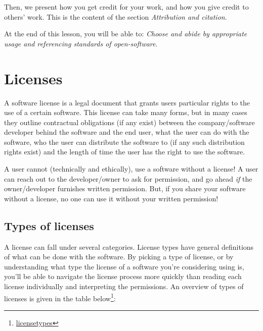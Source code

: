 \documentclass[
  letterpaper,
  DIV=11,
  numbers=noendperiod]{scrreport}
\begin{document}
Then, we present how you get credit for your work, and how you give
credit to others' work. This is the content of the section
\emph{Attribution and citation}.

At the end of this lesson, you will be able to: \emph{Choose and abide
by appropriate usage and referencing standards of open-software}.

\hypertarget{licenses}{%
\section{Licenses}\label{licenses}}

A software license is a legal document that grants users particular
rights to the use of a certain software. This license can take many
forms, but in many cases they outline contractual obligations (if any
exist) between the company/software developer behind the software and
the end user, what the user can do with the software, who the user can
distribute the software to (if any such distribution rights exist) and
the length of time the user has the right to use the software.

A user cannot (technically and ethically), use a software without a
license! A user can reach out to the developer/owner to ask for
permission, and go ahead \emph{if} the owner/developer furnishes written
permission. But, if you share your software without a license, no one
can use it without your written permission!

\hypertarget{types-of-licenses}{%
\subsection{Types of licenses}\label{types-of-licenses}}

A license can fall under several categories. License types have general
definitions of what can be done with the software. By picking a type of
license, or by understanding what type the license of a software you're
considering using is, you'll be able to navigate the license process
more quickly than reading each license individually and interpreting the
permissions. An overview of types of licenses is given in the table
below\footnote{\href{https://www.techtarget.com/searchcio/definition/software-license\#:~:text=A\%20software\%20license\%20is\%20a,the\%20software\%20without\%20violating\%20copyrights.}{licensetypes}}:
\end{document}
